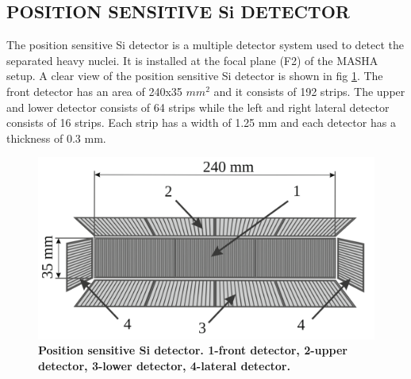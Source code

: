 \documentclass[12pt]{article}
\begin{document}
\subsection{POSITION SENSITIVE Si DETECTOR}
The position sensitive Si detector is a multiple detector system used to detect the separated heavy nuclei. It is installed at the focal plane (F2) of the MASHA setup. A clear view of the position sensitive Si detector is shown in fig \ref{Position sensitive Si detector. 1-front detector, 2-upper detector, 3-lower detector, 4-lateral detector.}. The front detector has an area of 240x35 $mm^2$ and it consists of 192 strips. The upper and lower detector consists of 64 strips while the left and right lateral detector consists of 16 strips. Each strip has a width of 1.25 mm and each detector has a thickness of 0.3 mm\cite{rodin2014masha}.

\begin{figure}[h]
\centering
\includegraphics[scale=.4]{Detector.png}
\caption{\textbf{Position sensitive Si detector. 1-front detector, 2-upper detector, 3-lower detector, 4-lateral detector.}}
\label{Position sensitive Si detector. 1-front detector, 2-upper detector, 3-lower detector, 4-lateral detector.}
\end{figure}
\end{document}
